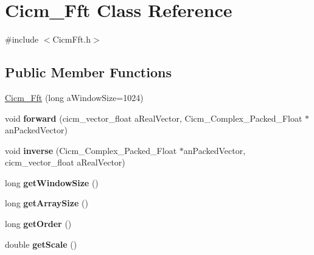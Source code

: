 \hypertarget{class_cicm___fft}{\section{Cicm\-\_\-\-Fft Class Reference}
\label{class_cicm___fft}
}


{\ttfamily \#include $<$Cicm\-Fft.\-h$>$}

\subsection*{Public Member Functions}
\begin{DoxyCompactItemize}
\item 
\hyperlink{class_cicm___fft_afe777a718830ab1f22119dcf6bfd1d58}{Cicm\-\_\-\-Fft} (long a\-Window\-Size=1024)
\item 
\hypertarget{class_cicm___fft_a78a6d1be775360a93ee63b99f7ee56cf}{void {\bfseries forward} (cicm\-\_\-vector\-\_\-float a\-Real\-Vector, Cicm\-\_\-\-Complex\-\_\-\-Packed\-\_\-\-Float $\ast$an\-Packed\-Vector)}\label{class_cicm___fft_a78a6d1be775360a93ee63b99f7ee56cf}

\item 
\hypertarget{class_cicm___fft_a3791358b85f2e7a591f7ea87a2882aa0}{void {\bfseries inverse} (Cicm\-\_\-\-Complex\-\_\-\-Packed\-\_\-\-Float $\ast$an\-Packed\-Vector, cicm\-\_\-vector\-\_\-float a\-Real\-Vector)}\label{class_cicm___fft_a3791358b85f2e7a591f7ea87a2882aa0}

\item 
\hypertarget{class_cicm___fft_ae86da3b4c424610d26c2cf36df9a6220}{long {\bfseries get\-Window\-Size} ()}\label{class_cicm___fft_ae86da3b4c424610d26c2cf36df9a6220}

\item 
\hypertarget{class_cicm___fft_a14bbb8e19dc6167254517a78e9baf377}{long {\bfseries get\-Array\-Size} ()}\label{class_cicm___fft_a14bbb8e19dc6167254517a78e9baf377}

\item 
\hypertarget{class_cicm___fft_a3567e8d6ec10f2e02e1bc7763bf4b8bb}{long {\bfseries get\-Order} ()}\label{class_cicm___fft_a3567e8d6ec10f2e02e1bc7763bf4b8bb}

\item 
\hypertarget{class_cicm___fft_a4f102798396e36cacd47b37795c3b07b}{double {\bfseries get\-Scale} ()}\label{class_cicm___fft_a4f102798396e36cacd47b37795c3b07b}

\end{DoxyCompactItemize}


